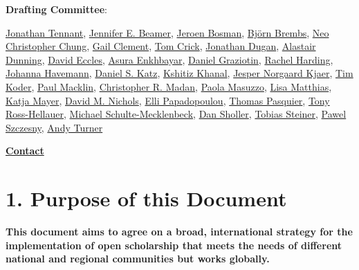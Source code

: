 \textbf{Drafting Committee}:

\href{https://orcid.org/0000-0001-7794-0218}{Jonathan Tennant},
\href{https://orcid.org/0000-0001-6887-6568}{Jennifer E. Beamer},
\href{https://orcid.org/0000-0001-5796-2727}{Jeroen Bosman},
\href{https://orcid.org/0000-0001-7824-7650}{Björn Brembs},
\href{https://orcid.org/0000-0001-6798-8867}{Neo Christopher Chung},
\href{https://orcid.org/0000-0001-5494-4806}{Gail Clement},
\href{https://orcid.org/0000-0001-5196-9389}{Tom Crick},
\href{https://orcid.org/0000-0001-8525-6221}{Jonathan Dugan},
\href{https://orcid.org/0000-0002-8344-4883}{Alastair Dunning},
\href{https://orcid.org/0000-0003-4634-4995}{David Eccles},
\href{https://orcid.org/0000-0002-3934-026X}{Asura Enkhbayar},
\href{https://orcid.org/0000-0002-9107-7681}{Daniel Graziotin},
\href{https://orcid.org/0000-0002-1134-391X}{Rachel Harding},
\href{https://orcid.org/0000-0002-6157-1494}{Johanna Havemann},
\href{https://orcid.org/0000-0001-5934-7525}{Daniel S. Katz},
\href{https://orcid.org/0000-0002-4765-4832}{Kshitiz Khanal},
\href{https://orcid.org/0000-0001-9183-9861}{Jesper Norgaard Kjaer},
\href{https://orcid.org/0000-0001-6152-7365}{Tim Koder},
\href{https://orcid.org/0000-0002-9925-0151}{Paul Macklin},
\href{https://orcid.org/0000-0003-3228-6501}{Christopher R. Madan},
\href{https://orcid.org/0000-0003-3699-1195}{Paola Masuzzo},
\href{https://orcid.org/0000-0002-2612-2132}{Lisa Matthias},
\href{https://orcid.org/0000-0003-1184-595X}{Katja Mayer},
\href{https://orcid.org/0000-0003-0321-7267}{David M. Nichols},
\href{https://orcid.org/0000-0002-0893-8509}{Elli Papadopoulou},
\href{https://orcid.org/0000-0001-6876-1306}{Thomas Pasquier},
\href{https://orcid.org/0000-0003-4470-7027}{Tony Ross-Hellauer},
\href{https://orcid.org/0000-0002-0406-8809}{Michael
Schulte-Mecklenbeck},
\href{https://scholar.google.com/citations?user=fHVPc94AAAAJ\&hl=en}{Dan
Sholler}, \href{https://orcid.org/0000-0002-3158-3136}{Tobias Steiner},
\href{https://orcid.org/0000-0001-8442-0157}{Pawel Szczesny},
\href{https://orcid.org/0000-0002-6098-6313}{Andy Turner}

\href{mailto:jon.tennant.2@gmail.com}{\textbf{Contact}}

\section{1. Purpose of this Document }\label{purpose-of-this-document}

\textbf{This document aims to agree on a broad, international strategy
for the implementation of open scholarship that meets the needs of
different national and regional communities but works globally.}

